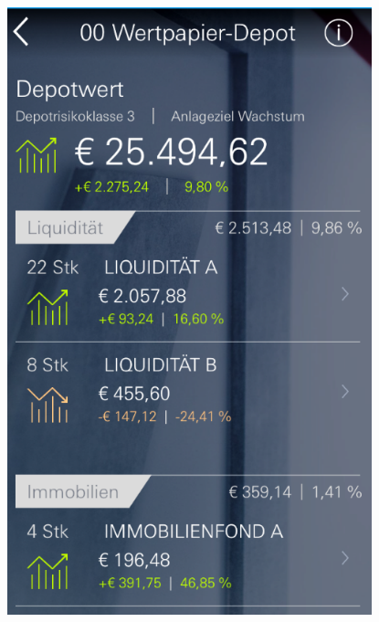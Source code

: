 \begin{figure}[H] 
    \begin{minipage}[b]{.5\linewidth}
        \centering\includegraphics[width=0.94\textwidth]{img/screenshots/ex4p3.png}
    \end{minipage}%
    \begin{minipage}[b]{.5\linewidth}

\end{minipage}
\end{figure}
